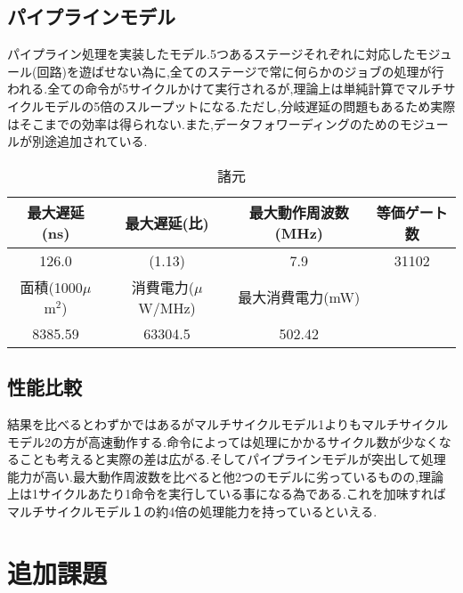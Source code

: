 \documentclass[11pt,a4j]{jarticle}
\begin{document}
\subsection{パイプラインモデル}
パイプライン処理を実装したモデル.5つあるステージそれぞれに対応したモジュール(回路)を遊ばせない為に,全てのステージで常に何らかのジョブの処理が行われる.全ての命令が5サイクルかけて実行されるが,理論上は単純計算でマルチサイクルモデルの5倍のスループットになる.ただし,分岐遅延の問題もあるため実際はそこまでの効率は得られない.また,データフォワーディングのためのモジュールが別途追加されている.
\begin{table}[htb]
\caption{諸元}
\begin{tabular}{|c|c|c|c|} \hline
最大遅延(ns) & 最大遅延(比) & 最大動作周波数(MHz) & 等価ゲート数 \\ \hline
126.0 & (1.13) & 7.9 & 31102 \\ \hline \hline
面積(1000$\mu$m$^2$) & 消費電力($\mu$W/MHz) & 最大消費電力(mW) & \\ \hline
8385.59 & 63304.5 & 502.42 & \\ \hline
\end{tabular}
\end{table}

\subsection{性能比較}
結果を比べるとわずかではあるがマルチサイクルモデル1よりもマルチサイクルモデル2の方が高速動作する.命令によっては処理にかかるサイクル数が少なくなることも考えると実際の差は広がる.そしてパイプラインモデルが突出して処理能力が高い.最大動作周波数を比べると他2つのモデルに劣っているものの,理論上は1サイクルあたり1命令を実行している事になる為である.これを加味すればマルチサイクルモデル１の約4倍の処理能力を持っているといえる.
\section{追加課題}
\end{document}
